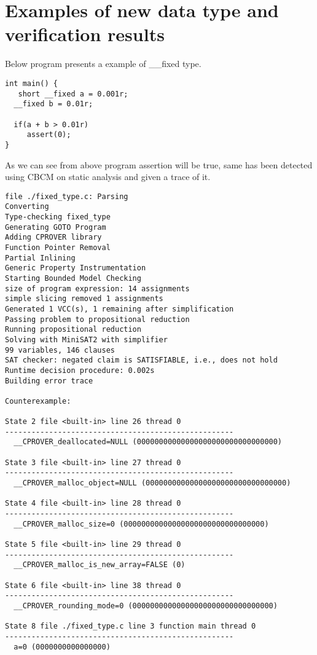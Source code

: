 \appendix
\chapter{Examples of new data type and verification results} \label{appendix:a}

Below program presents a example of \_\_fixed type.

\begin{lstlisting}
int main() {
   short __fixed a = 0.001r;
  __fixed b = 0.01r;

  if(a + b > 0.01r)
     assert(0);
}
\end{lstlisting}

As we can see from above program assertion will be true, same has been detected using CBCM on static analysis and given a trace of it.

\begin{lstlisting}
file ./fixed_type.c: Parsing
Converting
Type-checking fixed_type
Generating GOTO Program
Adding CPROVER library
Function Pointer Removal
Partial Inlining
Generic Property Instrumentation
Starting Bounded Model Checking
size of program expression: 14 assignments
simple slicing removed 1 assignments
Generated 1 VCC(s), 1 remaining after simplification
Passing problem to propositional reduction
Running propositional reduction
Solving with MiniSAT2 with simplifier
99 variables, 146 clauses
SAT checker: negated claim is SATISFIABLE, i.e., does not hold
Runtime decision procedure: 0.002s
Building error trace

Counterexample:

State 2 file <built-in> line 26 thread 0
----------------------------------------------------
  __CPROVER_deallocated=NULL (00000000000000000000000000000000)

State 3 file <built-in> line 27 thread 0
----------------------------------------------------
  __CPROVER_malloc_object=NULL (00000000000000000000000000000000)

State 4 file <built-in> line 28 thread 0
----------------------------------------------------
  __CPROVER_malloc_size=0 (00000000000000000000000000000000)

State 5 file <built-in> line 29 thread 0
----------------------------------------------------
  __CPROVER_malloc_is_new_array=FALSE (0)

State 6 file <built-in> line 38 thread 0
----------------------------------------------------
  __CPROVER_rounding_mode=0 (00000000000000000000000000000000)

State 8 file ./fixed_type.c line 3 function main thread 0
----------------------------------------------------
  a=0 (0000000000000000)


\end{lstlisting}
